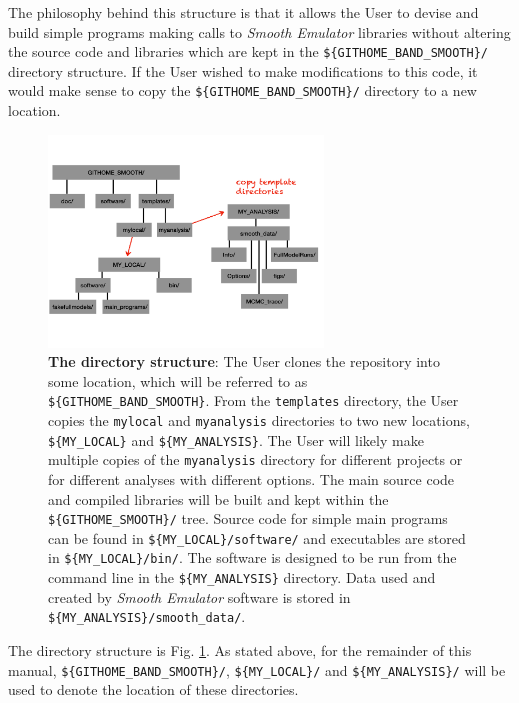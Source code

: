 \documentclass[UserManual.tex]{subfiles}
\begin{document}
The philosophy behind this structure is that it allows the User to devise and build simple programs making calls to {\it Smooth Emulator} libraries without altering the source code and libraries which are kept in the {\tt \$\{GITHOME\_BAND\_SMOOTH\}/} directory structure. If the User wished to make modifications to this code, it would make sense to copy the {\tt \$\{GITHOME\_BAND\_SMOOTH\}/} directory to a new location. 

\begin{figure}[t]
\centerline{\includegraphics[width = 0.65\textwidth]{figs/directorystructure}}
\caption{\label{fig:directorystructure}{\bf The directory structure}: The User clones the repository into some location, which will be referred to as {\tt \$\{\tt GITHOME\_BAND\_SMOOTH\}}. From the {\tt templates} directory, the User copies the {\tt mylocal} and {\tt myanalysis} directories to two new locations, {\tt \$\{MY\_LOCAL\}} and {\tt \$\{MY\_ANALYSIS\}}. The User will likely make multiple copies of the {\tt myanalysis} directory for different projects or for different analyses with different options. The main source code and compiled libraries will be built and kept within the {\tt \$\{GITHOME\_SMOOTH\}/} tree. Source code for simple main programs can be found in {\tt \$\{MY\_LOCAL\}/software/} and executables are stored in {\tt \$\{MY\_LOCAL\}/bin/}. The software is designed to be run from the command line in the {\tt \$\{MY\_ANALYSIS\}} directory. Data used and created by {\it Smooth Emulator} software is stored in {\tt \$\{MY\_ANALYSIS\}/smooth\_data/}. 
}
\end{figure}

The directory structure is Fig. \ref{fig:directorystructure}. As stated above, for the remainder of this manual, {\tt \$\{GITHOME\_BAND\_SMOOTH\}/}, {\tt \$\{MY\_LOCAL\}/} and {\tt \$\{MY\_ANALYSIS\}/} will be used to denote the location of these directories. 
\end{document}
